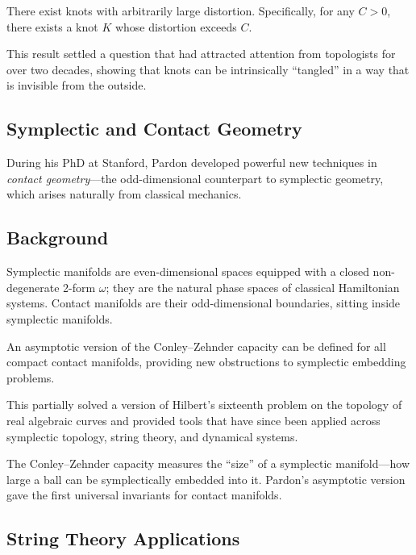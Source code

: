\begin{theorem}
There exist knots with arbitrarily large distortion. Specifically, for any $C > 0$, there exists a knot $K$ whose distortion exceeds $C$.
\end{theorem}

This result settled a question that had attracted attention from topologists for over two decades, showing that knots can be intrinsically ``tangled'' in a way that is invisible from the outside.

\subsection{Symplectic and Contact Geometry}

During his PhD at Stanford, Pardon developed powerful new techniques in \emph{contact geometry}---the odd-dimensional counterpart to symplectic geometry, which arises naturally from classical mechanics.

\subsection{Background}
Symplectic manifolds are even-dimensional spaces equipped with a closed non-degenerate 2-form $\omega$; they are the natural phase spaces of classical Hamiltonian systems. Contact manifolds are their odd-dimensional boundaries, sitting inside symplectic manifolds.

\begin{theorem}
An asymptotic version of the Conley--Zehnder capacity can be defined for all compact contact manifolds, providing new obstructions to symplectic embedding problems.
\end{theorem}

This partially solved a version of Hilbert's sixteenth problem on the topology of real algebraic curves and provided tools that have since been applied across symplectic topology, string theory, and dynamical systems.

\begin{highlightbox}
The Conley--Zehnder capacity measures the ``size'' of a symplectic manifold---how large a ball can be symplectically embedded into it. Pardon's asymptotic version gave the first universal invariants for contact manifolds.
\end{highlightbox}

\subsection{String Theory Applications}

